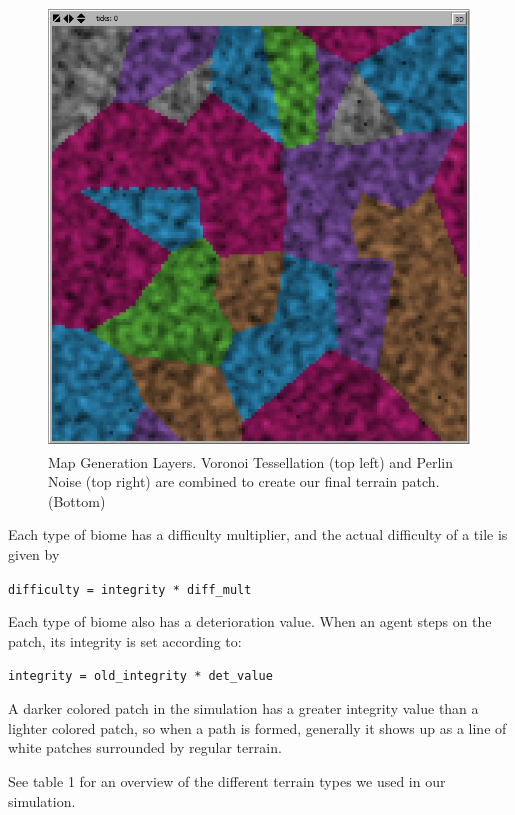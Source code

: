 \documentclass[conference]{IEEEtran}
\begin{document}
\begin{figure}[h]
\begin{center}
\includegraphics[scale=0.25]{image/both}
\end{center}
\caption{Map Generation Layers. Voronoi Tessellation (top left) and Perlin Noise (top right) are combined to create our final terrain patch. (Bottom)}
\end{figure}

Each type of biome has a difficulty multiplier, and the actual difficulty of a tile is given by

\begin{center}
\verb+difficulty = integrity * diff_mult+
\end{center}

\newpage
Each type of biome also has a deterioration value. When an agent steps on the patch, its integrity is set according to:

\begin{center}
\verb+integrity = old_integrity * det_value+
\end{center}

A darker colored patch in the simulation has a greater integrity value than a lighter colored patch, so when a path is formed, generally it shows up as a line of white patches surrounded by regular terrain.

See table 1 for an overview of the different terrain types we used in our simulation.
\end{document}
